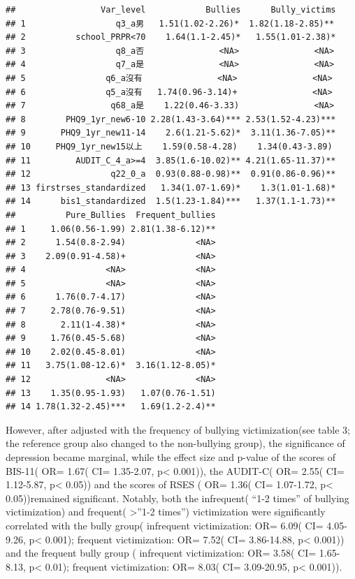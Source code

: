 \documentclass[
]{article}
\begin{document}
\begin{verbatim}
##                 Var_level            Bullies      Bully_victims
## 1                  q3_a男   1.51(1.02-2.26)*  1.82(1.18-2.85)**
## 2          school_PRPR<70    1.64(1.1-2.45)*   1.55(1.01-2.38)*
## 3                  q8_a否               <NA>               <NA>
## 4                  q7_a是               <NA>               <NA>
## 5                q6_a沒有               <NA>               <NA>
## 6                q5_a沒有   1.74(0.96-3.14)+               <NA>
## 7                 q68_a是    1.22(0.46-3.33)               <NA>
## 8        PHQ9_1yr_new6-10 2.28(1.43-3.64)*** 2.53(1.52-4.23)***
## 9       PHQ9_1yr_new11-14    2.6(1.21-5.62)*  3.11(1.36-7.05)**
## 10     PHQ9_1yr_new15以上    1.59(0.58-4.28)    1.34(0.43-3.89)
## 11         AUDIT_C_4_a>=4  3.85(1.6-10.02)** 4.21(1.65-11.37)**
## 12                q22_0_a  0.93(0.88-0.98)**  0.91(0.86-0.96)**
## 13 firstrses_standardized   1.34(1.07-1.69)*    1.3(1.01-1.68)*
## 14      bis1_standardized  1.5(1.23-1.84)***   1.37(1.1-1.73)**
##          Pure_Bullies  Frequent_bullies
## 1     1.06(0.56-1.99) 2.81(1.38-6.12)**
## 2      1.54(0.8-2.94)              <NA>
## 3    2.09(0.91-4.58)+              <NA>
## 4                <NA>              <NA>
## 5                <NA>              <NA>
## 6      1.76(0.7-4.17)              <NA>
## 7     2.78(0.76-9.51)              <NA>
## 8       2.11(1-4.38)*              <NA>
## 9     1.76(0.45-5.68)              <NA>
## 10    2.02(0.45-8.01)              <NA>
## 11   3.75(1.08-12.6)*  3.16(1.12-8.05)*
## 12               <NA>              <NA>
## 13    1.35(0.95-1.93)   1.07(0.76-1.51)
## 14 1.78(1.32-2.45)***   1.69(1.2-2.4)**
\end{verbatim}

However, after adjusted with the frequency of bullying victimization(see
table 3; the reference group also changed to the non-bullying group),
the significance of depression became marginal, while the effect size
and p-value of the scores of BIS-11( OR= 1.67( CI= 1.35-2.07,
p\textless{} 0.001)), the AUDIT-C( OR= 2.55( CI= 1.12-5.87, p\textless{}
0.05)) and the scores of RSES ( OR= 1.36( CI= 1.07-1.72, p\textless{}
0.05))remained significant. Notably, both the infrequent( ``1-2 times''
of bullying victimization) and frequent( \textgreater''1-2 times'')
victimization were significantly correlated with the bully group(
infrequent victimization: OR= 6.09( CI= 4.05-9.26, p\textless{} 0.001);
frequent victimization: OR= 7.52( CI= 3.86-14.88, p\textless{} 0.001))
and the frequent bully group ( infrequent victimization: OR= 3.58( CI=
1.65-8.13, p\textless{} 0.01); frequent victimization: OR= 8.03( CI=
3.09-20.95, p\textless{} 0.001)).
\end{document}
